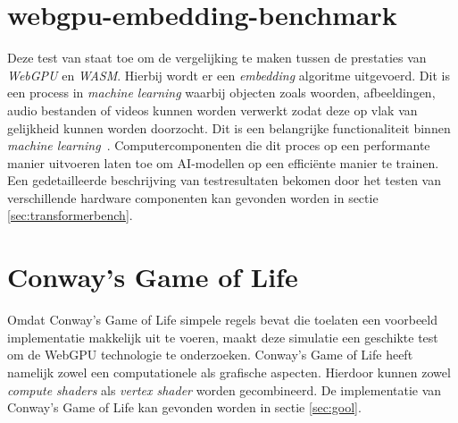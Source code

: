 \break{}

\section{webgpu-embedding-benchmark}

Deze test van \textcite{Lochner2024} staat toe om de vergelijking te maken tussen de prestaties van \textit{WebGPU} en \textit{WASM}. Hierbij wordt er een \textit{embedding} algoritme uitgevoerd. Dit is een process in \textit{machine learning} waarbij objecten zoals woorden, afbeeldingen, audio bestanden of videos kunnen worden verwerkt zodat deze op vlak van gelijkheid kunnen worden doorzocht. Dit is een belangrijke functionaliteit binnen \textit{machine learning}~\autocite{Cloudflare2024}. Computercomponenten die dit proces op een performante manier uitvoeren laten toe om AI-modellen op een efficiënte manier te trainen. Een gedetailleerde beschrijving van testresultaten bekomen door het testen van verschillende hardware componenten kan gevonden worden in sectie \ref{sec:transformerbench}.

\section{Conway's Game of Life}

Omdat Conway's Game of Life simpele regels bevat die toelaten een voorbeeld implementatie makkelijk uit te voeren, maakt deze simulatie een geschikte test om de WebGPU technologie te onderzoeken. Conway's Game of Life heeft namelijk zowel een computationele als grafische aspecten. Hierdoor kunnen zowel \textit{compute shaders} als \textit{vertex shader} worden gecombineerd. De implementatie van Conway's Game of Life kan gevonden worden in sectie \ref{sec:gool}.